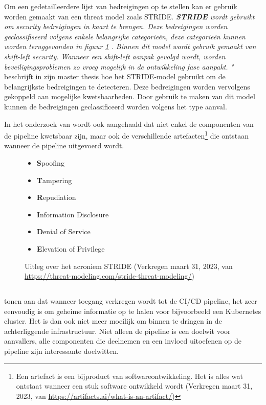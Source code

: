Om een gedetailleerdere lijst van bedreigingen op te stellen kan er gebruik worden gemaakt van een threat model zoals STRIDE. \textit{\textbf{STRIDE} wordt gebruikt om security bedreigingen in kaart te brengen. Deze bedreigingen worden geclassifiseerd volgens enkele belangrijke categorieën, deze categorieën kunnen worden teruggevonden in figuur \ref{fig:acronymSTRIDE} \autocite{VanLanduyt2021}. Binnen dit model wordt gebruik gemaakt van shift-left security. Wanneer een shift-left aanpak gevolgd wordt, worden beveiligingsproblemen zo vroeg mogelijk in de ontwikkeling fase aanpakt. \autocite{Kantor2021}"} \textcite{Paule2018} beschrijft in zijn master thesis hoe het STRIDE-model gebruikt om de belangrijkste bedreigingen te detecteren. Deze bedreigingen worden vervolgens gekoppeld aan mogelijke kwetsbaarheden. Door gebruik te maken van dit model kunnen de bedreigingen geclassificeerd worden volgens het type aanval. 
\newline

In het onderzoek van \textcite{Paule2018} wordt ook aangehaald dat niet enkel de componenten van de pipeline kwetsbaar zijn, maar ook de verschillende artefacten\footnote{Een artefact is een bijproduct van softwareontwikkeling. Het is alles wat ontstaat wanneer een stuk software ontwikkeld wordt (Verkregen maart 31, 2023, van \url{https://artifacts.ai/what-is-an-artifact/})} die ontstaan wanneer de pipeline uitgevoerd wordt.

\begin{figure}[H]
  \centering
  \begin{itemize}
    \setlength\itemsep{0.1em}
    \item\textbf{S}poofing
    \item\textbf{T}ampering
    \item\textbf{R}epudiation
    \item\textbf{I}nformation Disclosure
    \item\textbf{D}enial of Service
    \item\textbf{E}levation of Privilege
    \caption{\label{fig:acronymSTRIDE}Uitleg over het acroniem STRIDE (Verkregen maart 31, 2023, van \url{https://threat-modeling.com/stride-threat-modeling/})}
  \end{itemize}
\end{figure}

\subsection{}
\label{sec:Aanvallen binnenin pipeline}
\textcite{Pecka2022} tonen aan dat wanneer toegang verkregen wordt tot de CI/CD pipeline, het zeer eenvoudig is om geheime informatie op te halen voor bijvoorbeeld een Kubernetes cluster. Het is dan ook niet meer moeilijk om binnen te dringen in de achterliggende infrastructuur. Niet alleen de pipeline is een doelwit voor aanvallers, alle componenten die deelnemen en een invloed uitoefenen op de pipeline zijn interessante doelwitten.
\newline

